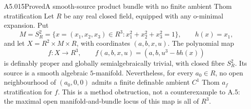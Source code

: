 \begin{saresult}{A5.015}{Proved}{A smooth-source product bundle with no finite ambient Thom stratification}
Let $R$ be any real closed field, equipped with any o-minimal expansion.
Put
\[
 M=S^2_R=\{x=(x_1,x_2,x_3)\in R^3:
                    x_1^2+x_2^2+x_3^2=1\},\qquad h(x)=x_1,
\]
and let $X=R^2\times M\times R$, with coordinates $(a,b,x,u)$.
The polynomial map
\[
 f:X\longrightarrow R^3,\qquad
 f(a,b,x,u)=(a,b,u^3-bh(x))
 \tag{A5.15.1}
\]
is definably proper and globally semialgebraically trivial, with closed
fibre $S^2_R$. Its source is a smooth algebraic $5$-manifold. Nevertheless,
for every $a_0\in R$, no open neighbourhood of $(a_0,0,0)$ admits a
finite definable ambient $C^1$ Thom $a_f$ stratification for $f$.
This is a method obstruction, not a counterexample to A.5: the maximal
open manifold-and-bundle locus of this map is all of $R^3$.
\end{saresult}
